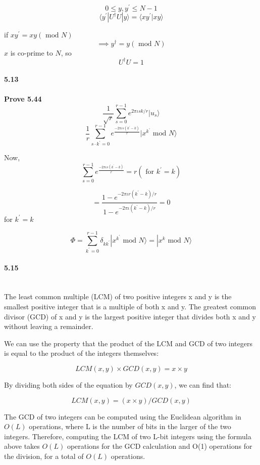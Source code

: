$$ 0 \le y,  y^{\prime} \le N-1$$
$$ \langle y^{\prime} | U^{\dagger} U|y\rangle = \langle x y^{\prime} | xy\rangle$$

if $xy^{\prime} = xy (\text{ mod } N)$
$$ \implies y^{\dagger} = y (\text{ mod } N)$$
$x$ is co-prime to $N$, so
$$ U^{\dagger} U = 1$$

\paragraph{5.13} \textbf{Prove 5.44}
\\

$$ \frac{1}{\sqrt{r}} \sum_{s=0}^{r-1} e^{2 \pi \iota s k/r} |u_s\rangle $$
$$ \frac{1}{r} \sum_{s \cdot k^{\prime} =0}^{r-1} e^{\frac{- 2 \pi \iota s(k^{\prime} -k)}{r}} |x^{k^{\prime}} \text{ mod } N\rangle$$

Now, 
$$\sum_{s=0}^{r-1} e^{\frac{-2 \pi \iota s (k^{\prime}-k)}{r}} = r (\text{ for } k^{\prime} = k)$$

$$ = \frac{1-e^{-2\pi \iota r (k^{\prime}-k)/r}}{1-e^{-2\pi \iota  (k^{\prime}-k)/r}} = 0$$
for $k^{\prime} = k$

$$ \Phi = \sum_{k^{\prime}=0}^{r-1} \delta_{k k^{\prime}} |x^{k^{\prime}} \text{ mod } N \rangle = |x^{k} \text{ mod } N\rangle$$

\paragraph{5.15} \textbf{}
\\

The least common multiple (LCM) of two positive integers x and y is the smallest positive integer that is a multiple of both x and y. The greatest common divisor (GCD) of x and y is the largest positive integer that divides both x and y without leaving a remainder.

We can use the property that the product of the LCM and GCD of two integers is equal to the product of the integers themselves:

$$ LCM(x,y) \times GCD(x,y) = x \times y $$

By dividing both sides of the equation by $GCD(x,y)$, we can find that:

$$LCM(x,y) = (x \times y) / GCD(x,y)$$

The GCD of two integers can be computed using the Euclidean algorithm in $O(L)$ operations, where L is the number of bits in the larger of the two integers. Therefore, computing the LCM of two L-bit integers using the formula above takes $O(L)$ operations for the GCD calculation and O(1) operations for the division, for a total of $O(L)$ operations.

